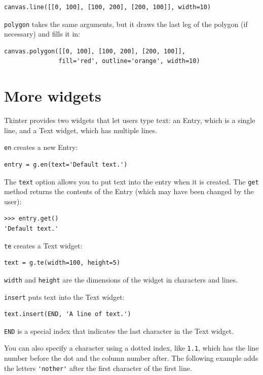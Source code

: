 \documentclass[10pt]{book}
\begin{document}
{\beforeverb
\begin{verbatim}
canvas.line([[0, 100], [100, 200], [200, 100]], width=10)
\end{verbatim}
\afterverb
%
{\tt polygon} takes the same arguments, but it draws the last
leg of the polygon (if necessary) and fills it in:

\beforeverb
\begin{verbatim}
canvas.polygon([[0, 100], [100, 200], [200, 100]],
               fill='red', outline='orange', width=10)
\end{verbatim}
\afterverb
%


\section{More widgets}


Tkinter provides two widgets that let users type text: an
Entry, which is a single line, and a Text widget, which has
multiple lines.


{\tt en} creates a new Entry:

\beforeverb
\begin{verbatim}
entry = g.en(text='Default text.')
\end{verbatim}
\afterverb
%
The {\tt text} option allows you to put text into the entry
when it is created.  The {\tt get} method returns the contents
of the Entry (which may have been changed by the user):

\beforeverb
\begin{verbatim}
>>> entry.get()
'Default text.'
\end{verbatim}
\afterverb
%
{\tt te} creates a Text widget:

\beforeverb
\begin{verbatim}
text = g.te(width=100, height=5)
\end{verbatim}
\afterverb
%
{\tt width} and {\tt height} are the dimensions of the
widget in characters and lines.

{\tt insert} puts text into the Text widget:

\beforeverb
\begin{verbatim}
text.insert(END, 'A line of text.')
\end{verbatim}
\afterverb
%
{\tt END} is a special index that indicates the last character in the
Text widget.

You can also specify a character using a dotted index, like {\tt 1.1},
which has the line number before the dot and the column number after.
The following example adds the letters \verb"'nother'" after the first
character of the first line.

}
\end{document}
